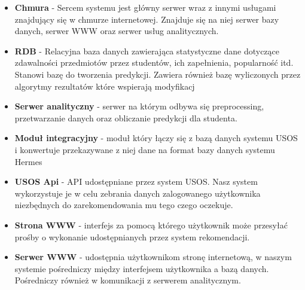 \documentclass[licencjacka]{pracamgr}
\begin{document}
 \begin{itemize}
 
\item \textbf{Chmura} - Sercem systemu jest główny serwer wraz z innymi usługami znajdujący się w chmurze internetowej. Znajduje się na niej serwer bazy danych, serwer WWW oraz serwer usług analitycznych.

\item \textbf {RDB} - Relacyjna baza danych zawierająca statystyczne dane dotyczące zdawalności przedmiotów przez studentów, ich zapełnienia, popularność itd. Stanowi bazę do tworzenia predykcji. Zawiera również bazę wyliczonych przez algorytmy rezultatów które wspierają modyfikacj

\item \textbf{Serwer analityczny} - serwer na którym odbywa się preprocessing, przetwarzanie danych oraz obliczanie predykcji dla studenta.

\item \textbf{Moduł integracyjny} - moduł który łączy się z bazą danych systemu USOS i konwertuje przekazywane z niej dane na format bazy danych systemu Hermes
 
\item \textbf{USOS Api} - API udostępniane przez system USOS. Nasz system wykorzystuje je w celu zebrania danych zalogowanego użytkownika niezbędnych do zarekomendowania mu tego czego oczekuje.

\item \textbf{Strona WWW} - interfejs za pomocą którego użytkownik może przesyłać prośby o wykonanie udostępnianych przez system rekomendacji.

\item \textbf{Serwer WWW} - udostępnia użytkownikom stronę internetową, w naszym systemie pośredniczy między interfejsem użytkownika a bazą danych. Pośredniczy również w komunikacji z serwerem analitycznym.

  
\end{itemize}
\end{document}
